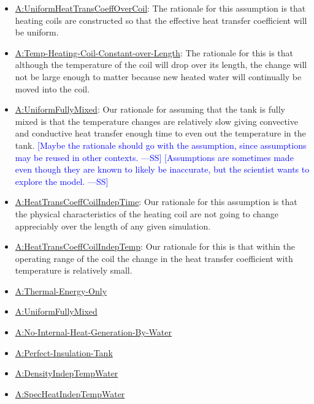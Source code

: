 \documentclass[12pt]{article}
\newcommand{\authornote}[3]{\textcolor{#1}{[#3 ---#2]}}
\newcommand{\authornote}[3]{}
\newcommand{\wss}[1]{\authornote{blue}{SS}{#1}}
\begin{document}
\begin{itemize}
\item \hyperref[assumpUnifHeatTransCoeffCoil]{A:UniformHeatTransCoeffOverCoil}:
The rationale for this assumption is that heating coils are constructed so that
the effective heat transfer coefficient will be uniform.

\item \hyperref[assumpTHCCoL]{A:Temp-Heating-Coil-Constant-over-Length}: The
rationale for this is that although the temperature of the coil will drop over
its length, the change will not be large enough to matter because new heated
water will continually be moved into the coil.

\item \hyperref[assumpFullyMixed]{A:UniformFullyMixed}: Our rationale for assuming
that the tank is fully mixed is that the temperature changes are relatively slow
giving convective and conductive heat transfer enough time to even out the
temperature in the tank.  \wss{Maybe the rationale should go with the
assumption, since assumptions may be reused in other contexts.}
\wss{Assumptions are sometimes made even though they are known to likely be
inaccurate, but the scientist wants to explore the model.}

\item \hyperref[assumpHeatTransCoilIndepTime]{A:HeatTransCoeffCoilIndepTime}:
Our rationale for this assumption is that the physical characteristics of the
heating coil are not going to change appreciably over the length of any given
simulation.

\item \hyperref[assumpHeatTransCoilIndepTemp]{A:HeatTransCoeffCoilIndepTemp}:
Our rationale for this is that within the operating range of the coil the change
in the heat transfer coefficient with temperature is relatively small.

\item \hyperref[assumpTEO]{A:Thermal-Energy-Only}

\item \hyperref[assumpFullyMixed]{A:UniformFullyMixed}

\item \hyperref[assumpNIHGBW]{A:No-Internal-Heat-Generation-By-Water}

\item \hyperref[assumpPIT]{A:Perfect-Insulation-Tank}

\item \hyperref[assumpDensIndepTWater]{A:DensityIndepTempWater}

\item \hyperref[assumpSpecHeatIndepTWater]{A:SpecHeatIndepTempWater}

\end{itemize}
        
\end{document}
